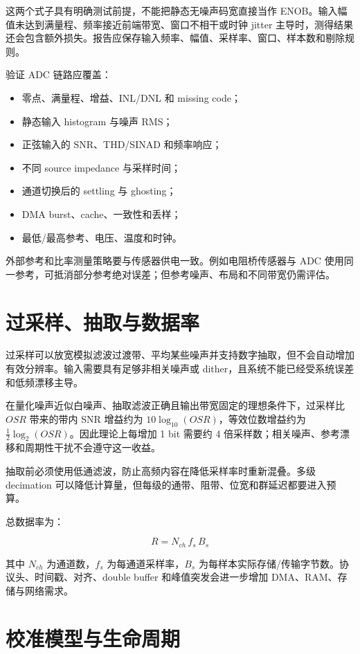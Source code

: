 这两个式子具有明确测试前提，不能把静态无噪声码宽直接当作 ENOB。输入幅值未达到满量程、频率接近前端带宽、窗口不相干或时钟 jitter 主导时，测得结果还会包含额外损失。报告应保存输入频率、幅值、采样率、窗口、样本数和剔除规则。

验证 ADC 链路应覆盖：

\begin{itemize}
  \item 零点、满量程、增益、INL/DNL 和 missing code；
  \item 静态输入 histogram 与噪声 RMS；
  \item 正弦输入的 SNR、THD/SINAD 和频率响应；
  \item 不同 source impedance 与采样时间；
  \item 通道切换后的 settling 与 ghosting；
  \item DMA burst、cache、一致性和丢样；
  \item 最低/最高参考、电压、温度和时钟。
\end{itemize}

外部参考和比率测量策略要与传感器供电一致。例如电阻桥传感器与 ADC 使用同一参考，可抵消部分参考绝对误差；但参考噪声、布局和不同带宽仍需评估。

\section{过采样、抽取与数据率}

过采样可以放宽模拟滤波过渡带、平均某些噪声并支持数字抽取，但不会自动增加有效分辨率。输入需要具有足够非相关噪声或 dither，且系统不能已经受系统误差和低频漂移主导。

在量化噪声近似白噪声、抽取滤波正确且输出带宽固定的理想条件下，过采样比 $OSR$ 带来的带内 SNR 增益约为 $10\log_{10}(OSR)$，等效位数增益约为 $\tfrac{1}{2}\log_2(OSR)$。因此理论上每增加 1 bit 需要约 4 倍采样数；相关噪声、参考漂移和周期性干扰不会遵守这一收益。

抽取前必须使用低通滤波，防止高频内容在降低采样率时重新混叠。多级 decimation 可以降低计算量，但每级的通带、阻带、位宽和群延迟都要进入预算。

总数据率为：

\begin{equation}
  R=N_{ch}\,f_s\,B_s
\end{equation}

其中 $N_{ch}$ 为通道数，$f_s$ 为每通道采样率，$B_s$ 为每样本实际存储/传输字节数。协议头、时间戳、对齐、double buffer 和峰值突发会进一步增加 DMA、RAM、存储与网络需求。

\section{校准模型与生命周期}

